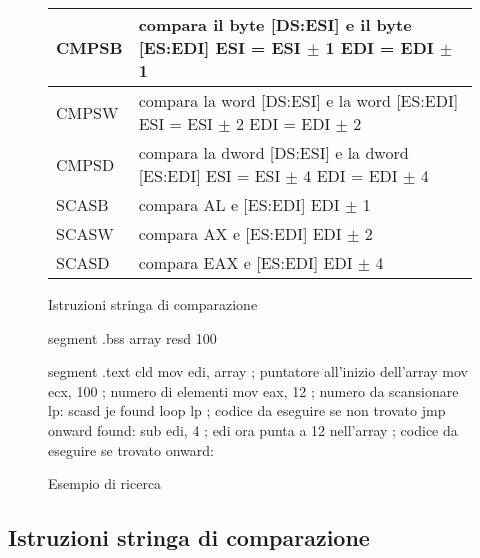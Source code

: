 \begin{figure}[t]
\centering
{\code
\begin{tabular}{|lp{3.5in}|}
\hline
CMPSB & compara il byte [DS:ESI] e il byte [ES:EDI] \newline ESI = ESI $\pm$ 1 
        \newline EDI = EDI $\pm$ 1 \\
\hline
CMPSW & compara la word [DS:ESI] e la word [ES:EDI] \newline ESI = ESI $\pm$ 2 
        \newline EDI = EDI $\pm$ 2 \\
\hline
CMPSD & compara la dword [DS:ESI] e la dword [ES:EDI] \newline ESI = ESI $\pm$ 4 
        \newline EDI = EDI $\pm$ 4 \\
\hline
SCASB & compara AL e [ES:EDI] \newline EDI $\pm$ 1 \\
\hline
SCASW & compara AX e [ES:EDI] \newline EDI $\pm$ 2 \\
\hline
SCASD & compara EAX e [ES:EDI] \newline EDI $\pm$ 4 \\
\hline
\end{tabular}
}
\caption{Istruzioni stringa di comparazione\label{fig:cmpString}
            
          }
\end{figure}

\begin{figure}[t]
\begin{AsmCodeListing}[frame=single,commandchars=\\\{\}]
segment .bss
array        resd 100

segment .text
      cld
      mov    edi, array    ; puntatore all'inizio dell'array
      mov    ecx, 100      ; numero di elementi
      mov    eax, 12       ; numero da scansionare
lp:
      scasd    \label{line:scasdSrchStrEx}
      je     found
      loop   lp
 ; codice da eseguire se non trovato
      jmp    onward
found:
      sub    edi, 4      ; edi ora punta a 12 nell'array\label{line:subSrchStrEx}
 ; codice da eseguire se trovato
onward:
\end{AsmCodeListing}
\caption{Esempio di ricerca\label{fig:srchStrEx}}
\end{figure}

\subsection{Istruzioni stringa di comparazione}

